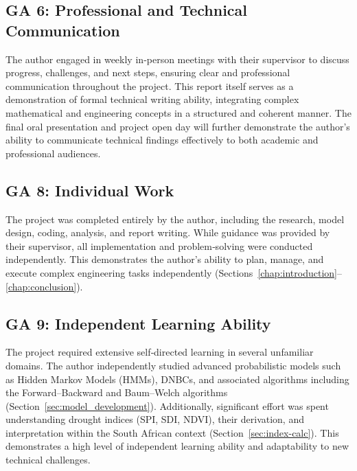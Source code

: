 \subsection*{GA 6: Professional and Technical Communication}
The author engaged in weekly in‐person meetings with their supervisor to discuss progress, challenges, and next steps, ensuring clear and professional communication throughout the project. This report itself serves as a demonstration of formal technical writing ability, integrating complex mathematical and engineering concepts in a structured and coherent manner. The final oral presentation and project open day will further demonstrate the author’s ability to communicate technical findings effectively to both academic and professional audiences.

\subsection*{GA 8: Individual Work}
The project was completed entirely by the author, including the research, model design, coding, analysis, and report writing. While guidance was provided by their supervisor, all implementation and problem‐solving were conducted independently. This demonstrates the author’s ability to plan, manage, and execute complex engineering tasks independently (Sections~\ref{chap:introduction}–\ref{chap:conclusion}).

\subsection*{GA 9: Independent Learning Ability}
The project required extensive self‐directed learning in several unfamiliar domains. The author independently studied advanced probabilistic models such as Hidden Markov Models (HMMs), DNBCs, and associated algorithms including the Forward–Backward and Baum–Welch algorithms (Section~\ref{sec:model_development}). Additionally, significant effort was spent understanding drought indices (SPI, SDI, NDVI), their derivation, and interpretation within the South African context (Section~\ref{sec:index-calc}). This demonstrates a high level of independent learning ability and adaptability to new technical challenges.


